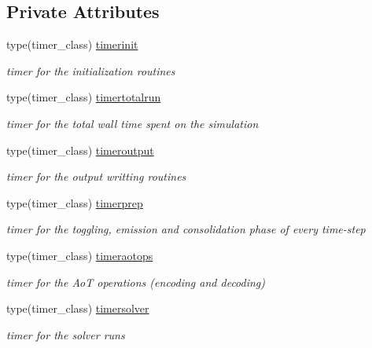 \subsection*{Private Attributes}
\begin{DoxyCompactItemize}
\item 
type(timer\+\_\+class) \mbox{\hyperlink{structsimulation__mod_1_1simulation__class_ae5fe25a2db3a3e3c6896c13af90edb1c}{timerinit}}
\begin{DoxyCompactList}\small\item\em timer for the initialization routines \end{DoxyCompactList}\item 
type(timer\+\_\+class) \mbox{\hyperlink{structsimulation__mod_1_1simulation__class_aff028c1a3b421c73038e43b860f45de1}{timertotalrun}}
\begin{DoxyCompactList}\small\item\em timer for the total wall time spent on the simulation \end{DoxyCompactList}\item 
type(timer\+\_\+class) \mbox{\hyperlink{structsimulation__mod_1_1simulation__class_a8273da2899310646a161fedc96434bf9}{timeroutput}}
\begin{DoxyCompactList}\small\item\em timer for the output writting routines \end{DoxyCompactList}\item 
type(timer\+\_\+class) \mbox{\hyperlink{structsimulation__mod_1_1simulation__class_ac759ee5fda4ddfb16deeb833c59709e3}{timerprep}}
\begin{DoxyCompactList}\small\item\em timer for the toggling, emission and consolidation phase of every time-\/step \end{DoxyCompactList}\item 
type(timer\+\_\+class) \mbox{\hyperlink{structsimulation__mod_1_1simulation__class_a257e36d030e7226c67f04e871ab39a6b}{timeraotops}}
\begin{DoxyCompactList}\small\item\em timer for the AoT operations (encoding and decoding) \end{DoxyCompactList}\item 
type(timer\+\_\+class) \mbox{\hyperlink{structsimulation__mod_1_1simulation__class_a25e03717a6e87410b816ac1f299b282b}{timersolver}}
\begin{DoxyCompactList}\small\item\em timer for the solver runs \end{DoxyCompactList}\item 

\end{DoxyCompactItemize}
